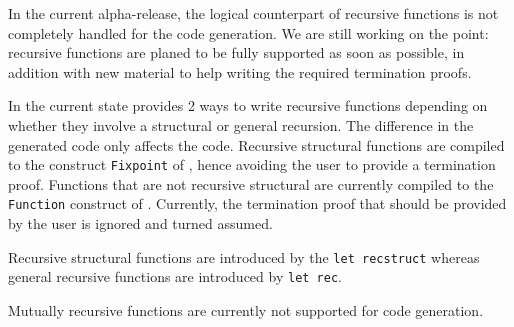 In the current alpha-release, the logical counterpart of recursive
functions is not completely handled for the {\coq} code generation. We
are still working on the point: recursive functions are planed to be
fully supported as soon as possible, in addition with new material to
help writing the required termination proofs.

In the current state {\focal} provides 2 ways to write recursive
functions depending on whether they involve a structural or general
recursion. The difference in the generated code only affects the
{\coq} code. Recursive structural functions are compiled to the
construct {\tt Fixpoint} of {\coq}, hence avoiding the user to provide a
termination proof. Functions that are not recursive structural are
currently compiled to the {\tt Function} construct of {\coq}. Currently,
the termination proof that should be provided by the user is ignored
and turned assumed.

Recursive structural functions are introduced by the {\tt let recstruct}
whereas general recursive functions are introduced by {\tt let rec}.

Mutually recursive functions are currently not supported for {\coq}
code generation.
